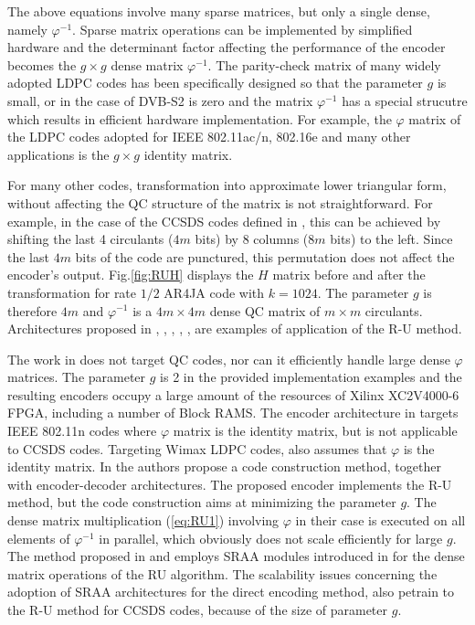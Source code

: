 The above equations involve many sparse matrices, but only a single dense, namely $\varphi^{-1}$. Sparse matrix operations can be implemented by simplified hardware and the determinant factor affecting the performance of the encoder becomes the $g \times g$ dense matrix $\varphi^{-1}$. The parity-check matrix of many widely adopted LDPC codes has been specifically designed so that the parameter $g$ is small, or in the case of DVB-S2 is zero and the matrix $\varphi^{-1}$ has a special strucutre which results in efficient hardware implementation. For example, the $\varphi$ matrix of the LDPC codes adopted for IEEE 802.11ac/n, 802.16e and many other applications is the $g \times g$ identity matrix.\par
For many other codes, transformation into approximate lower triangular form, without affecting the QC structure of the matrix is not straightforward. For example, in the case of the CCSDS codes defined in \cite{CCSDS131.0}, this can be achieved by shifting the last 4 circulants ($4m$ bits) by 8 columns ($8m$ bits) to the left. Since the last $4m$ bits of the code are punctured, this permutation does not affect the encoder's output. Fig.\ref{fig:RUH} displays the $H$ matrix before and after the transformation for rate $1/2$ AR4JA code with $k=1024$. The parameter $g$ is therefore $4m$ and $\varphi^{-1}$ is a $4m \times 4m$ dense QC matrix of $m \times m$ circulants.             
Architectures proposed in \cite{Lee2004}, \cite{Tzimpragos2013}, \cite{HaoZhong2005}, \cite{Yu2014}, \cite{Wang2017}, \cite{HaibinZhang2008} are examples of application of the R-U method.\par
          The work in \cite{Lee2004} does not target QC codes, nor can it efficiently handle large dense $\varphi$ matrices. The parameter $g$ is 2 in the provided implementation examples and the resulting encoders occupy a large amount of the resources of Xilinx XC2V4000-6 FPGA, including a number of Block RAMS. The encoder architecture in \cite{Tzimpragos2013} targets IEEE 802.11n codes where $\varphi$ matrix is the identity matrix, but is not applicable to CCSDS codes. Targeting Wimax LDPC codes, \cite{Wang2017} also assumes that $\varphi$ is the identity matrix. In \cite{HaoZhong2005} the authors propose a code construction method, together with encoder-decoder architectures. The proposed encoder implements the R-U method, but the code construction aims at minimizing the parameter $g$. The dense matrix multiplication (\ref{eq:RU1}) involving $\varphi$ in their case is executed on all elements of $\varphi^{-1}$ in parallel, which obviously does not scale efficiently for large $g$. The method proposed in \cite{HaibinZhang2008} and \cite{Yu2014} employs SRAA modules introduced in \cite{ZongwangLi2006} for the dense matrix operations of the RU algorithm. The scalability issues concerning the adoption of SRAA architectures for the direct encoding method, also petrain to the R-U method for CCSDS codes, because of the size of parameter $g$.\par
